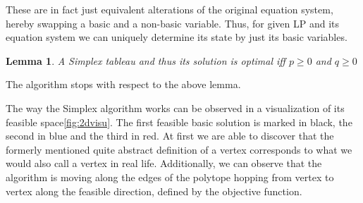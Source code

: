\documentclass[a4paper, 11pt]{article}
\newtheorem{lemma}{Lemma}
\begin{document}
These are in fact just equivalent alterations of the original equation system, hereby swapping a basic and a non-basic variable. Thus, for given LP and its equation system we can uniquely determine its state by just its basic variables. 

\begin{lemma}
	A Simplex tableau and thus its solution is optimal iff $p\geq0$ and $q\geq0$
\end{lemma}

The algorithm stops with respect to the above lemma. 

The way the Simplex algorithm works can be observed in a visualization of its feasible space\ref{fig:2dvisu}. The first feasible basic solution is marked in black, the second in blue and the third in red. At first we are able to discover that the formerly mentioned quite abstract definition of a vertex corresponds to what we would also call a vertex in real life. Additionally, we can observe that the algorithm is moving along the edges of the polytope hopping from vertex to vertex along the feasible direction, defined by the objective function. \\
\end{document}
